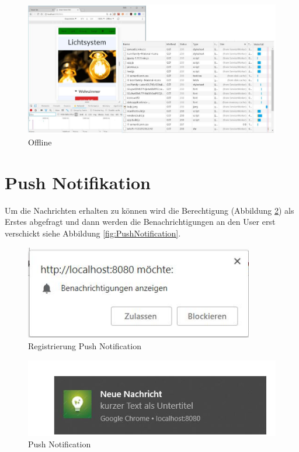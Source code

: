 \begin{figure}[h]
	\centering
	\includegraphics[width=14cm]{BilderAllgemein/Offline}\medskip
	\caption{Offline}
	\label{fig:Offline}
\end{figure}

\newpage

\section{Push Notifikation}
Um die Nachrichten erhalten zu können wird die Berechtigung (Abbildung \ref{fig:Registrierung}) als Erstes abgefragt und dann werden die Benachrichtigungen an den User erst verschickt siehe Abbildung \ref{fig:PushNotification}.

\begin{figure}[h]
	\centering
	\includegraphics[width=10cm]{BilderAllgemein/PushNotification/Registrierung}\medskip
	\caption{Registrierung Push Notification}
	\label{fig:Registrierung}
\end{figure}

\begin{figure}[h]
	\centering
	\includegraphics[width=14cm]{BilderAllgemein/PushNotification/Nachricht}\medskip
	\caption{Push Notification}
	\label{fig:Nachricht}
\end{figure}
\newpage

